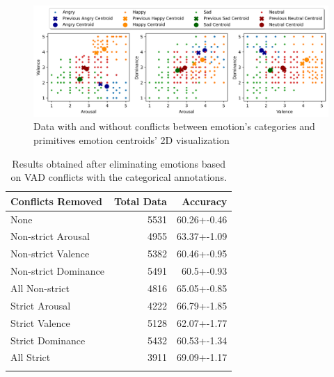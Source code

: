 \begin{figure}[H]
  \centering
  \includegraphics[width=.9\linewidth]{figs/5_data_stratification/strict_conflicts_centroids_2d.png}
  \caption{Data with and without conflicts between emotion's categories and primitives emotion centroids' 2D visualization}
  \label{fig:signalWP}
\end{figure}



\begin{table}[H]
\small
\caption{Results obtained after eliminating emotions based on VAD conflicts with the categorical annotations.}
\label{tab:dominance}
\centering
    \begin{tabular}{lrr}
        \toprule
        Conflicts Removed &    Total Data &  Accuracy  \\
        \midrule
        None & 5531 & 60.26+-0.46 \\         \addlinespace
        
        \hline
        \addlinespace
        
        Non-strict Arousal    &   4955 & 63.37+-1.09 \\         \addlinespace
        Non-strict Valence    &  5382 &  60.46+-0.95 \\   \addlinespace
        Non-strict Dominance   & 5491  & 60.5+-0.93 \\         \addlinespace
        All Non-strict  &  4816 & 65.05+-0.85 \\         \addlinespace
        
        \hline
        \addlinespace
        
        Strict Arousal    &  4222 & 66.79+-1.85 \\         \addlinespace
        Strict Valence    &  5128 &  62.07+-1.77 \\   \addlinespace
        Strict Dominance   & 5432  & 60.53+-1.34 \\         \addlinespace
        All Strict  &  3911 & 69.09+-1.17 \\         \addlinespace
        \bottomrule
    \end{tabular}
\end{table}
